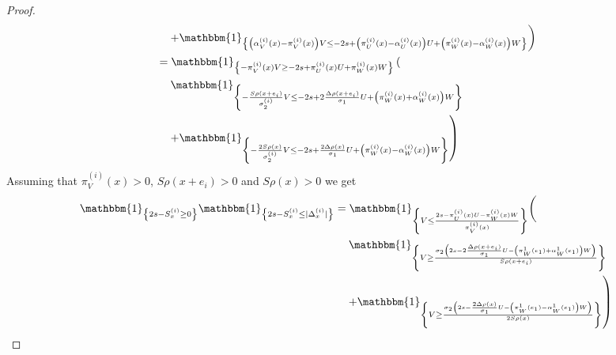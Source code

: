 \documentclass[12pt]{article}
\theoremstyle{Theorem}
\begin{document}
\begin{proof}
{\begin{align*}
& \hspace{0.35cm} \left. + \mathbbm{1}_{\left\{ \left(\alpha^{\scriptscriptstyle (i)}_{V}(x) - \pi^{\scriptscriptstyle (i)}_{V}(x)\right)V \leq  -2s + \left(\pi^{\scriptscriptstyle (i)}_{U}(x) - \alpha^{\scriptscriptstyle (i)}_{U}(x)\right)U + \left(\pi^{\scriptscriptstyle (i)}_{W}(x) - \alpha^{\scriptscriptstyle (i)}_{W}(x)\right)W\right\}}\right) \\
& = \mathbbm{1}_{\left\{ - \pi^{\scriptscriptstyle (i)}_{V}(x)V \geq -2s +   \pi^{\scriptscriptstyle (i)}_{U}(x)U + \pi^{\scriptscriptstyle (i)}_{W}(x)W\right\}}\left(\right.\\
& \hspace{0.35cm}  \left. \mathbbm{1}_{\left\{ - \frac{S\rho(x+e_i)}{\sigma^{\scriptscriptstyle(i)}_{2}}V \leq -2s+ 2\frac{\Delta\rho(x+e_i)}{\sigma_1}U +   \left(\pi^{\scriptscriptstyle (i)}_{W}(x) + \alpha^{\scriptscriptstyle (i)}_{W}(x)\right)W\right\}} \right. \\
& \hspace{0.35cm} \left. + \mathbbm{1}_{\left\{ -\frac{2S\rho(x)}{\sigma^{\scriptscriptstyle(i)}_{2}}V \leq  -2s +\frac{2\Delta\rho(x)}{\sigma_1}U +  \left(\pi^{\scriptscriptstyle (i)}_{W}(x) - \alpha^{\scriptscriptstyle (i)}_{W}(x)\right)W\right\}}\right) \\
\end{align*}}
Assuming that $\pi^{\scriptscriptstyle (i)}_{V}(x) > 0 $, $S\rho(x+e_i)> 0$ and $S\rho(x)> 0$ we get 
{\small
\begin{align*}
\mathbbm{1}_{\left\{ 2s - S^{\scriptscriptstyle (i)}_{\scriptscriptstyle x} \geq 0 \right\}}\mathbbm{1}_{\left\{ 2s - S^{\scriptscriptstyle (i)}_{\scriptscriptstyle x} \leq |\Delta^{\scriptscriptstyle (i)}_ {\scriptscriptstyle x}|\right\}} & = \mathbbm{1}_{\left\{ V \leq \frac{2s -   \pi^{\scriptscriptstyle (i)}_{U}(x)U - \pi^{\scriptscriptstyle (i)}_{W}(x)W}{\pi^{\scriptscriptstyle (i)}_{V}(x)}\right\}} \bigg( \\
& \hspace{0.35cm}  \left. \mathbbm{1}_{\left\{V \geq \frac{\sigma_{2}\left(2s - 2\frac{\Delta\rho(x+e_i)}{\sigma_1}U -  \left(\pi^{1}_{W}(e_1) + \alpha^{1}_{W}(e_1)\right)W\right)}{S\rho(x+e_i)}\right\}} \right. \\
& \hspace{0.35cm} \left. + \mathbbm{1}_{\left\{ V \geq \frac{\sigma_{2}\left(2s -\frac{2\Delta\rho(x)}{\sigma_1}U - \left(\pi^{1}_{W}(e_1) - \alpha^{1}_{W}(e_1)\right)W\right)}{2S\rho(x)}\right\}}\right)
\end{align*}}

\end{proof}
\end{document}
